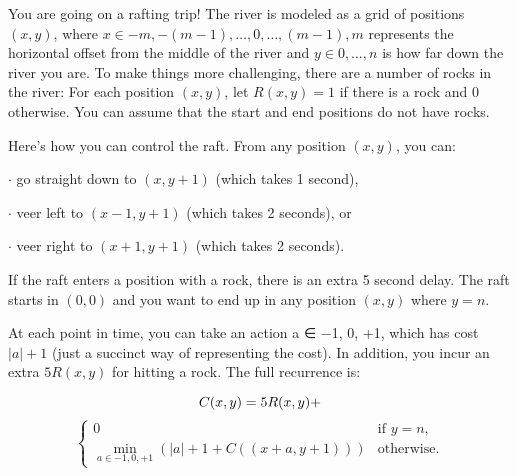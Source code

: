 \documentclass[4pt,landscape]{article}
\begin{document}
\begin{multicols*}{4}
{\tiny You are going on a rafting trip! The river is modeled as a grid of positions $(x, y)$, where
$x \in {−m, −(m − 1), \hdots , 0, \hdots ,(m − 1), m}$ represents the horizontal offset from the middle
of the river and $y \in {0, \hdots , n}$ is how far down the river you are. To make things more
challenging, there are a number of rocks in the river: For each position $(x, y)$, let $R(x, y) = 1$
if there is a rock and $0$ otherwise. You can assume that the start and end positions do not
have rocks.}\par
{\tiny Here’s how you can control the raft. From any position $(x, y)$, you can:}\par
{\tiny $\cdot$ go straight down to $(x, y + 1)$ (which takes 1 second),}\par
{\tiny $\cdot$ veer left to $(x − 1, y + 1)$ (which takes 2 seconds), or}\par
{\tiny $\cdot$ veer right to $(x + 1, y + 1)$ (which takes 2 seconds).}\par
{\tiny If the raft enters a position with a rock, there is an extra 5 second delay. The raft starts in
$(0, 0)$ and you want to end up in any position $(x, y)$ where $y = n$.}\par

{\tiny {\color{purple}{DP Solution:}} At each point in time, you can take an action a ∈ {−1, 0, +1}, which has cost $|a|+1$ (just a succinct way of representing the cost). In addition, you incur an extra $5R(x, y)$ for hitting a rock. The full recurrence is:}\par
\vspace{-0.05cm}\[\tiny C(x, y) = 5R(x, y) + \]\[\begin{cases}
0 & \text{if }y = n,\\
\displaystyle\min_{a\in{−1,0,+1}}(|a| + 1 + C((x + a, y + 1))) &\text{otherwise}.\end{cases}\]


\end{multicols*}
\end{document}
